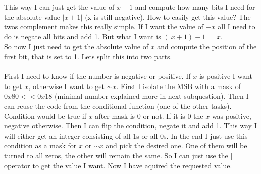\documentclass[a4paper]{article}
\begin{document}
\noindent This way I can just get the value of $x + 1$ and compute how many bits I need for the absolute
value $|x + 1|$ (x is still negative). How to easily get this value? The twos complement
makes this really simple. If I want the value of $-x$ all I need to do is negate all bits and add 1.
But what I want is $(~x + 1) - 1 = ~x$. \\

\noindent So now I just need to get the absolute value of $x$ and compute the position 
of the first bit, that
is set to 1. Lets split this into two parts. \\

 \\

\noindent First I need to know if the number is negative or positive. If $x$ is positive I want to 
get $x$, otherwise I want to get $\sim x$. 
First I isolate the MSB with a mask of $0x80 << 0x18$ (minimal number
explained more in next subquestion). Then I can reuse the code from the conditional function 
(one of the other
tasks). Condition would be true if $x$ after mask is 0 or not. 
If it is 0 the $x$ was positive, negative
otherwise. Then I can flip the condition, negate it and add 1. This way I will either get an integer
consisting of all 1s or all 0s. In the end I just use this condition as a mask for $x$ or $\sim x$ 
and pick the desired one. One of them will be turned to all zeros, the other will remain the same.
So I can just use the $|$ operator to get the value I want. Now I have aquired the requested value. \\
 
 \\
\end{document}
